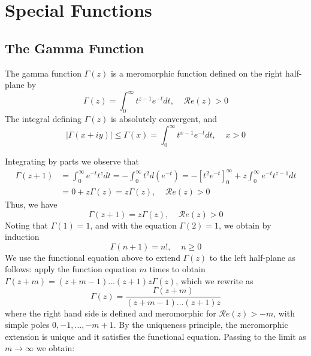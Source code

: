 %
%
%
\chapter{Special Functions}
\label{SpecFuncs} %

\section{The Gamma Function}

\begin{definition}
    The gamma function $\Gamma(z)$ is a meromorphic function defined on the right half-plane by \begin{equation*}
        \Gamma(z) = \int_0^{\infty}t^{z-1}e^{-t}dt,\;\;\;\;\mathscr{R}e(z) > 0
    \end{equation*}
    The integral defining $\Gamma(z)$ is absolutely convergent, and \begin{equation*}
        |\Gamma(x+iy)| \leq \Gamma(x) = \int_0^{\infty}t^{x-1}e^{-t}dt,\;\;\;\;x>0
    \end{equation*}
\end{definition}

Integrating by parts we observe that \begin{align*}
    \Gamma(z+1) &= \int_0^{\infty}e^{-t}t^zdt = -\int_0^{\infty}t^2d(e^{-t}) = -[t^2e^{-t}]_0^{\infty} + z\int_0^{\infty}e^{-t}t^{z-1}dt \\
    &= 0 + z\Gamma(z)  = z\Gamma(z),\;\;\;\;\mathscr{R}e(z) > 0
\end{align*}
Thus, we have \begin{equation*}
    \boxed{\Gamma(z+1) = z\Gamma(z),\;\;\;\;\mathscr{R}e(z) > 0}
\end{equation*}
Noting that $\Gamma(1) = 1$, and with the equation $\Gamma(2) = 1$, we obtain by induction \begin{equation*}
    \boxed{\Gamma(n+1) = n!,\;\;\;\;n\geq 0}
\end{equation*}
We use the functional equation above to extend $\Gamma(z)$ to the left half-plane as follows: apply the function equation $m$ times to obtain $\Gamma(z+m)=(z+m-1)...(z+1)z\Gamma(z)$, which we rewrite as \begin{equation*}
    \boxed{\Gamma(z) = \frac{\Gamma(z+m)}{(z+m-1)...(z+1)z}}
\end{equation*}
where the right hand side is defined and meromorphic for $\mathscr{R}e(z) > -m$, with simple poles $0,-1,...,-m+1$. By the uniqueness principle, the meromorphic extension is unique and it satisfies the functional equation. Passing to the limit as $m\rightarrow \infty$ we obtain:

